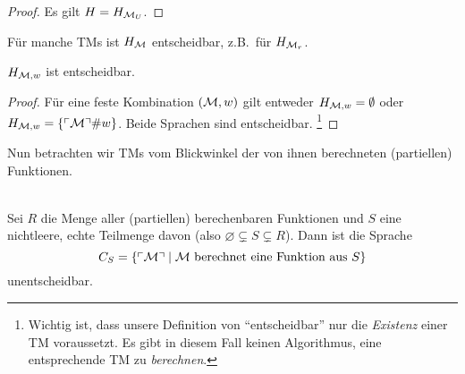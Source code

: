 \begin{proof}
	Es gilt $H = H_{\mathcal{M}_U}$.
\end{proof}

\begin{Bemerkung}
	Für manche \ac{TM}s ist $H_{\mathcal{M}}$ entscheidbar, z.B.\ für $H_{\mathcal{M}_r}$.
\end{Bemerkung}

\begin{lemma}
	$H_{\mathcal{M}, w}$ ist entscheidbar.
\end{lemma}

\begin{proof}
	Für eine feste Kombination $(\mathcal{M}, w)$ gilt entweder $H_{\mathcal{M}, w} = \emptyset$ oder  $H_{\mathcal{M}, w} = \{\ulcorner \mathcal{M} \urcorner\# w\}$.
	Beide Sprachen sind entscheidbar.%
	\footnote{Wichtig ist, dass unsere Definition von "`entscheidbar"' nur die \emph{Existenz} einer \ac{TM} voraussetzt.
	Es gibt in diesem Fall keinen Algorithmus, eine entsprechende \ac{TM} zu \emph{berechnen}.}
\end{proof}



Nun betrachten wir \ac{TM}s vom Blickwinkel der von ihnen berechneten
(partiellen) Funktionen.

\begin{Satz}\ \\
  Sei $R$ die Menge aller (partiellen) berechenbaren Funktionen und $S$
  eine nichtleere, echte Teilmenge davon (also $\varnothing \subsetneq S \subsetneq R$).
  Dann ist die Sprache
  $$C_S=\{\ulcorner \mathcal{M} \urcorner \mid \mathcal{M} \text{ berechnet eine Funktion aus }S\}$$
  unentscheidbar.
\end{Satz}


